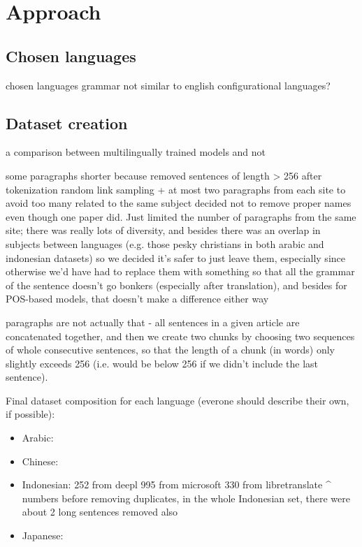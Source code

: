 \documentclass[twocolumn]{article}
\begin{document}
\section*{Approach}

\subsection*{Chosen languages}

chosen languages
grammar not similar to english
configurational languages?

\subsection*{Dataset creation}

a comparison between multilingually trained models and not

some paragraphs shorter because removed sentences of length > 256 after tokenization
random link sampling + at most two paragraphs from each site to avoid too many related to the same subject
decided not to remove proper names even though one paper did. Just limited the number of paragraphs from the same site; there was really lots of diversity, and besides there was an overlap in subjects between languages (e.g. those pesky christians in both arabic and indonesian datasets) so we decided it's safer to just leave them, especially since otherwise we'd have had to replace them with something so that all the grammar of the sentence doesn't go bonkers (especially after translation), and besides for POS-based models, that doesn't make a difference either way

paragraphs are not actually that - all sentences in a given article are concatenated together, and then we create two chunks by choosing two sequences of whole consecutive sentences, so that the length of a chunk (in words) only slightly exceeds 256 (i.e. would be below 256 if we didn't include the last sentence).

Final dataset composition for each language (everone should describe their own, if possible):

\begin{itemize}
	\item Arabic:
	\item Chinese:
	\item Indonesian:
	252 from deepl
995 from  microsoft
330 from  libretranslate
^ numbers before removing duplicates, in the whole Indonesian set, there were about 2%
long sentences removed also
	\item Japanese:
\end{itemize}
\end{document}
